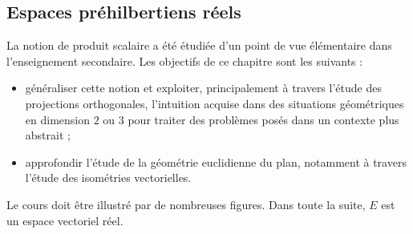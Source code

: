 \subsection{Espaces préhilbertiens réels}
\begin{itshape}
La notion de produit scalaire a été étudiée d'un point de vue élémentaire
dans l'enseignement secondaire. Les objectifs  de ce chapitre sont les suivants :
\begin{itemize}
\item
généraliser cette notion et  exploiter, principalement à travers l'étude des projections orthogonales, l'intuition acquise dans des situations géométriques en dimension $2$ ou $3$ pour traiter des problèmes posés dans un contexte plus abstrait ;
\item
approfondir l'étude de la géométrie euclidienne du plan, notamment à travers l'étude des isométries vectorielles.
\end{itemize}
Le cours doit être illustré par de nombreuses figures. Dans toute la suite, $E$ est un espace vectoriel réel.
\end{itshape}

\begin{parcolumns}[rulebetween,distance=2.5cm]{2}
  \colplacechunks

  \colchunk{}
  \colplacechunks
\end{parcolumns}

\begin{parcolumns}[rulebetween,distance=2.5cm]{2}
  \colchunk{}
  \colplacechunks

  \colplacechunks
  
  \colchunk{}
  \colplacechunks

  \colchunk{}
  \colplacechunks
  \end{parcolumns}

